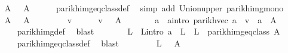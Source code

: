 \begin{isabellebody}
\ \ \isamarkupfalse%
\ {\isachardoublequoteopen}{\isasymPsi}\ A\ {\isasymsubseteq}\ {\isasymPsi}\ {\isacharquery}{\kern0pt}A{\isacharprime}{\kern0pt}{\isachardoublequoteclose}\isanewline
\ \ \ \ \isamarkupfalse%
\ parikh{\isacharunderscore}{\kern0pt}img{\isacharunderscore}{\kern0pt}eq{\isacharunderscore}{\kern0pt}class{\isacharunderscore}{\kern0pt}def\ \isamarkupfalse%
\ {\isacharparenleft}{\kern0pt}simp\ add{\isacharcolon}{\kern0pt}\ Union{\isacharunderscore}{\kern0pt}upper\ parikh{\isacharunderscore}{\kern0pt}img{\isacharunderscore}{\kern0pt}mono{\isacharparenright}{\kern0pt}\isanewline
\ \ \isamarkupfalse%
\ {\isachardoublequoteopen}{\isasymPsi}\ {\isacharquery}{\kern0pt}A{\isacharprime}{\kern0pt}\ {\isasymsubseteq}\ {\isasymPsi}\ A{\isachardoublequoteclose}\isanewline
\ \ \isamarkupfalse%
\isanewline
\ \ \ \ \isamarkupfalse%
\ v\isanewline
\ \ \ \ \isamarkupfalse%
\ {\isachardoublequoteopen}v\ {\isasymin}\ {\isasymPsi}\ {\isacharquery}{\kern0pt}A{\isacharprime}{\kern0pt}{\isachardoublequoteclose}\isanewline
\ \ \ \ \isamarkupfalse%
\ \isamarkupfalse%
\ a\ \ a{\isacharunderscore}{\kern0pt}intro{\isacharcolon}{\kern0pt}\ {\isachardoublequoteopen}parikh{\isacharunderscore}{\kern0pt}vec\ a\ {\isacharequal}{\kern0pt}\ v\ {\isasymand}\ a\ {\isasymin}\ {\isacharquery}{\kern0pt}A{\isacharprime}{\kern0pt}{\isachardoublequoteclose}\isanewline
\ \ \ \ \ \ \isamarkupfalse%
\ parikh{\isacharunderscore}{\kern0pt}img{\isacharunderscore}{\kern0pt}def\ \isamarkupfalse%
\ blast\isanewline
\ \ \ \ \isamarkupfalse%
\ \isamarkupfalse%
\ L\ \ L{\isacharunderscore}{\kern0pt}intro{\isacharcolon}{\kern0pt}\ {\isachardoublequoteopen}a\ {\isasymin}\ L\ {\isasymand}\ L\ {\isasymin}\ parikh{\isacharunderscore}{\kern0pt}img{\isacharunderscore}{\kern0pt}eq{\isacharunderscore}{\kern0pt}class\ A{\isachardoublequoteclose}\isanewline
\ \ \ \ \ \ \isamarkupfalse%
\ parikh{\isacharunderscore}{\kern0pt}img{\isacharunderscore}{\kern0pt}eq{\isacharunderscore}{\kern0pt}class{\isacharunderscore}{\kern0pt}def\ \isamarkupfalse%
\ blast\isanewline
\ \ \ \ \isamarkupfalse%
\ \isamarkupfalse%
\ {\isachardoublequoteopen}{\isasymPsi}\ L\ {\isacharequal}{\kern0pt}\ {\isasymPsi}\ A{\isachardoublequoteclose}\ \isamarkupfalse%

\end{isabellebody}
